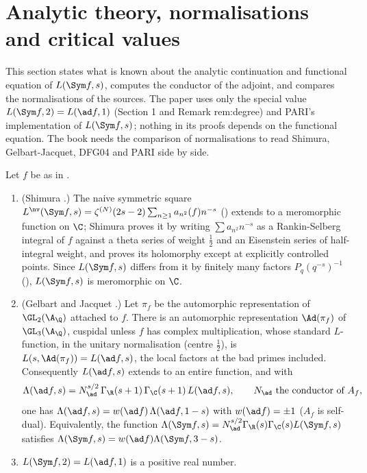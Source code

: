 \section{Analytic theory, normalisations and critical values}\label{sec:lfunctions:analytic}

This section states what is known about the analytic continuation and functional equation of $L(\Sym f,s)$, computes the conductor of the adjoint, and
compares the normalisations of the sources. The paper uses only the special value $L(\Sym f,2)=L(\ad f,1)$ (Section 1 and Remark rem:degree) and PARI's
implementation of $L(\Sym f,s)$; nothing in its proofs depends on the functional equation. The book needs the comparison of normalisations to read Shimura,
Gelbart-Jacquet, DFG04 and PARI side by side.

\begin{theorem}\label{thm:lfunctions:sym2-analytic}
Let $f$ be as in .
\begin{enumerate}[label=(\roman*)]
\item (Shimura \cite{Shimura75}.) The naive symmetric square $L^{\nv}(\Sym f,s)=\zeta^{(N)}(2s-2)\sum_{n\ge1}a_{n^2}(f)n^{-s}$ () extends to a
meromorphic function on $\C$; Shimura proves it by writing $\sum a_{n^2}n^{-s}$ as a Rankin-Selberg integral of $f$ against a theta series of weight $\frac12$ and an
Eisenstein series of half-integral weight, and proves its holomorphy except at explicitly controlled points. Since $L(\Sym f,s)$ differs from it by finitely
many factors $P_q(q^{-s})^{-1}$ (), $L(\Sym f,s)$ is meromorphic on $\C$.
\item (Gelbart and Jacquet \cite{GelbartJacquet}.) Let $\pi_f$ be the automorphic representation of $\GL_2(\A_\Q)$ attached to $f$. There is an automorphic
representation $\Ad(\pi_f)$ of $\GL_3(\A_\Q)$, cuspidal unless $f$ has complex multiplication, whose standard $L$-function, in the unitary normalisation (centre
$\frac12$), is $L(s,\Ad(\pi_f))=L(\ad f,s)$, the local factors at the bad primes included. Consequently $L(\ad f,s)$ extends to an entire function, and with
\[
\Lambda(\ad f,s)=N_{\ad}^{s/2}\,\Gamma_\R(s+1)\,\Gamma_\C(s+1)\,L(\ad f,s),\qquad N_{\ad}\text{ the conductor of }A_f,
\]
one has $\Lambda(\ad f,s)=w(\ad f)\,\Lambda(\ad f,1-s)$ with $w(\ad f)=\pm1$ ($A_f$ is self-dual). Equivalently, the function
$\Lambda(\Sym f,s)=N_{\ad}^{s/2}\Gamma_\R(s)\Gamma_\C(s)L(\Sym f,s)$ satisfies $\Lambda(\Sym f,s)=w(\ad f)\Lambda(\Sym f,3-s)$.
\item $L(\Sym f,2)=L(\ad f,1)$ is a positive real number.
\end{enumerate}
\end{theorem}

